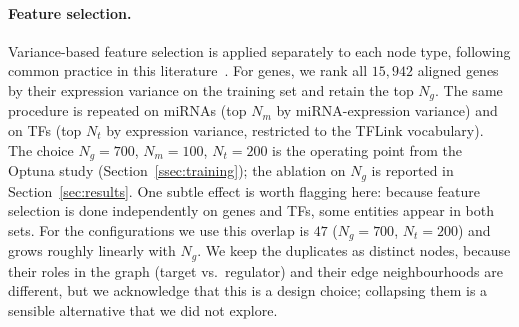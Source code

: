 \documentclass[review,3p,times,11pt, ]{elsarticle} %
\begin{document}
\paragraph{Feature selection.}
Variance-based feature selection is applied separately to each node
type, following common practice in this
literature~\cite{li_multimodal_2024,xiao_graph_2023}. For genes, we rank
all $15{,}942$ aligned genes by their expression variance on the
training set and retain the top $N_g$. The same procedure is repeated
on miRNAs (top $N_m$ by miRNA-expression variance) and on TFs (top
$N_t$ by expression variance, restricted to the TFLink vocabulary). The
choice $N_g = 700$, $N_m = 100$, $N_t = 200$ is the operating point
from the Optuna study (Section~\ref{ssec:training}); the ablation on
$N_g$ is reported in Section~\ref{sec:results}. One subtle effect is
worth flagging here: because feature selection is done independently on
genes and TFs, some entities appear in both sets. For the configurations
we use this overlap is $47$ ($N_g = 700$, $N_t = 200$) and grows
roughly linearly with $N_g$. We keep the duplicates as distinct nodes,
because their roles in the graph (target vs.\ regulator) and their edge
neighbourhoods are different, but we acknowledge that this is a design
choice; collapsing them is a sensible alternative that we did not
explore.
\end{document}
